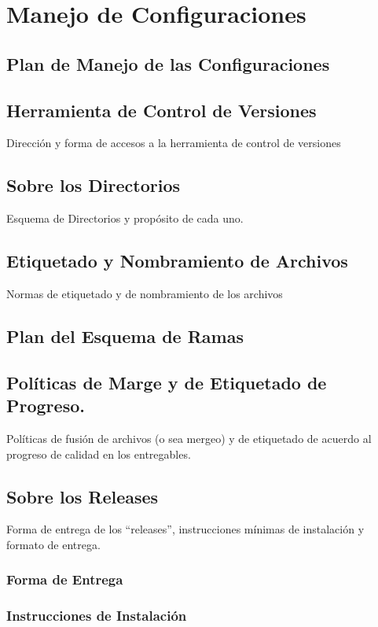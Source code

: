 \documentclass[10pt]{article} %
\begin{document}
\section{Manejo de Configuraciones}

\subsection{Plan de Manejo de las Configuraciones}

\subsection{Herramienta de Control de Versiones}
Dirección y forma de accesos a la herramienta de control de versiones

\subsection{Sobre los Directorios}
Esquema de Directorios y propósito de cada uno.

\subsection{Etiquetado y Nombramiento de Archivos}
Normas de etiquetado y de nombramiento de los archivos

\subsection{Plan del Esquema de Ramas}

\subsection{Políticas de Marge y de Etiquetado de Progreso.}
Políticas de fusión de archivos (o sea mergeo) y de etiquetado de acuerdo al progreso de calidad en los entregables.

\subsection{Sobre los Releases}
Forma de entrega de los “releases”, instrucciones mínimas de instalación y formato de entrega.

\subsubsection{Forma de Entrega}

\subsubsection{Instrucciones de Instalación}
\end{document}
